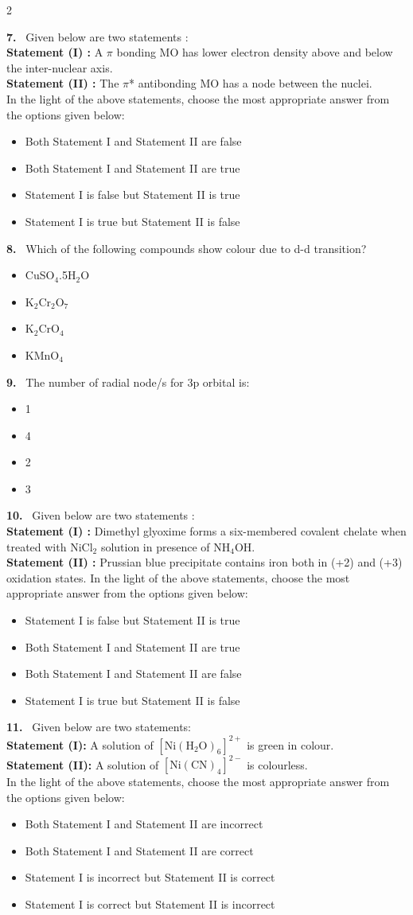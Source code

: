 \documentclass[10pt]{extarticle}
\newcommand{\qn}[1]{\par\smallskip\noindent\textbf{#1.}~}
\newenvironment{qoptions}{\begin{itemize}[leftmargin=1.8em,itemsep=1pt,topsep=2pt,label={}]}{\end{itemize}}
\newcommand{\opt}[2]{\item[(#1)] #2}
\begin{document}
\begin{multicols}{2}
\qn{7} Given below are two statements :\\
\textbf{Statement (I) :} A $\pi$ bonding MO has lower electron density above and below the inter-nuclear axis.\\
\textbf{Statement (II) :} The $\pi$* antibonding MO has a node between the nuclei.\\
In the light of the above statements, choose the most appropriate answer from the options given below:
\begin{qoptions}
\opt{A}{Both Statement I and Statement II are false}
\opt{B}{Both Statement I and Statement II are true}
\opt{C}{Statement I is false but Statement II is true}
\opt{D}{Statement I is true but Statement II is false}
\end{qoptions}

\qn{8} Which of the following compounds show colour due to d-d transition?
\begin{qoptions}
\opt{A}{CuSO$_4$.5H$_2$O}
\opt{B}{K$_2$Cr$_2$O$_7$}
\opt{C}{K$_2$CrO$_4$}
\opt{D}{KMnO$_4$}
\end{qoptions}

\qn{9} The number of radial node/s for 3p orbital is:
\begin{qoptions}
\opt{A}{1}
\opt{B}{4}
\opt{C}{2}
\opt{D}{3}
\end{qoptions}

\qn{10} Given below are two statements :\\
\textbf{Statement (I) :} Dimethyl glyoxime forms a six-membered covalent chelate when treated with NiCl$_2$ solution in presence of NH$_4$OH.\\
\textbf{Statement (II) :} Prussian blue precipitate contains iron both in (+2) and (+3) oxidation states. In the light of the above statements, choose the most appropriate answer from the options given below:
\begin{qoptions}
\opt{A}{Statement I is false but Statement II is true}
\opt{B}{Both Statement I and Statement II are true}
\opt{C}{Both Statement I and Statement II are false}
\opt{D}{Statement I is true but Statement II is false}
\end{qoptions}

\qn{11} Given below are two statements:\\
\textbf{Statement (I):} A solution of $[\mathrm{Ni(H_2O)_6}]^{2+}$ is green in colour.\\
\textbf{Statement (II):} A solution of $[\mathrm{Ni(CN)_4}]^{2-}$ is colourless.\\
In the light of the above statements, choose the most appropriate answer from the options given below:
\begin{qoptions}
\opt{A}{Both Statement I and Statement II are incorrect}
\opt{B}{Both Statement I and Statement II are correct}
\opt{C}{Statement I is incorrect but Statement II is correct}
\opt{D}{Statement I is correct but Statement II is incorrect}
\end{qoptions}


\end{multicols}
\end{document}

